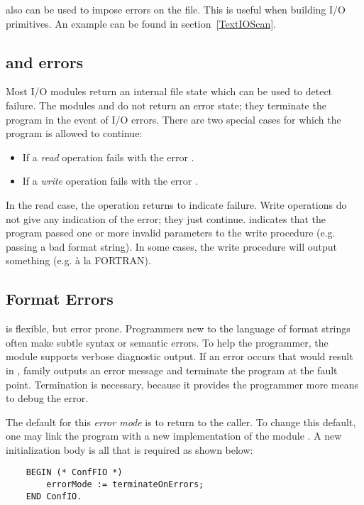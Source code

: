  also can be used to impose errors on the file.
This is useful when building I/O primitives.  An example can
be found in section~\ref{TextIOScan}.


\subsection{ and  errors}

Most I/O modules return an internal file state which can be
used to detect failure.  The modules  and
 do not return an error state; they terminate
the program in the event of I/O errors.  There are two special
cases for which the program is allowed to continue:
\begin{itemize}
\item
    If a {\em read} operation fails with the error
    .

\item
    If a {\em write} operation fails with the error
    . 
\end{itemize}
In the read case, the operation returns  to indicate
failure.  Write operations do not give any indication of the error;
they just continue.   indicates that the
program passed one or more invalid parameters to the write procedure
(e.g. passing a bad format string).  In some cases, the write procedure
will output something (e.g. \code{*****} \`{a} la {\sc FORTRAN}).  

\subsection{Format Errors}

 is flexible, but error prone.  Programmers new
to the language of format strings often make subtle syntax or
semantic errors.  To help the programmer, the module 
supports verbose diagnostic output.  If an error occurs that would
result in ,  family 
outputs an error message and terminate the program at the fault point.
Termination is necessary, because it provides the programmer more means
to debug the error.

The default for this {\em error mode} is to return 
to the caller.  To change this default, one may link the program with
a new implementation of the module .  A new initialization
body is all that is required as shown below:
\begin{verbatim}
    BEGIN (* ConfFIO *)
        errorMode := terminateOnErrors;
    END ConfIO.
\end{verbatim}

